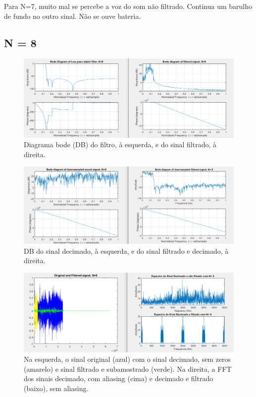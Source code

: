 \documentclass{article}
\begin{document}
\raggedright
\vspace{5mm} %

Para N=7, muito mal se percebe a voz do som não filtrado. Continua um barulho de fundo no outro sinal.
Não se ouve bateria.

\newpage

\subsection{N = 8}
\vfill
\begin{figure}[h!]
\centering
\includegraphics[scale=0.5]{matlab_test_images/cut_images/fil20.PNG}
\caption{Diagrama bode (DB) do filtro, à esquerda, e do sinal filtrado, à direita.}
\label{fig:matlab_test_images/cut_images/fil20}
\end{figure}
\begin{figure}[h!]
\centering
\includegraphics[scale=0.5]{matlab_test_images/cut_images/fil21.PNG}
\caption{DB do sinal decimado, à esquerda, e do sinal filtrado e decimado, à direita.}
\label{fig:matlab_test_images/cut_images/fil21}
\end{figure}  
\newpage
\begin{figure}[h!]
\centering
\includegraphics[scale=0.5]{matlab_test_images/cut_images/fil22.PNG}
\caption{Na esquerda, o sinal original (azul) com o sinal decimado, sem zeros (amarelo) e sinal filtrado e subamostrado (verde). Na direita, a FFT dos sinais decimado, com aliasing (cima) e decimado e filtrado (baixo), sem aliasing.}
\label{fig:matlab_test_images/cut_images/fil22}
\end{figure}  
\end{document}
